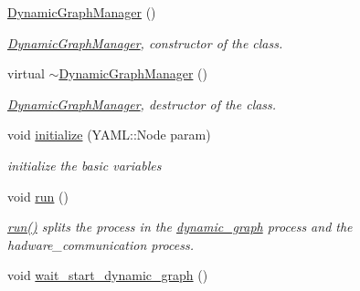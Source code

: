 \begin{DoxyCompactItemize}
\item 
\hyperlink{classdynamic__graph_1_1DynamicGraphManager_afd98424082e5a1f878e6c7cb08a62c4a}{Dynamic\+Graph\+Manager} ()\hypertarget{classdynamic__graph_1_1DynamicGraphManager_afd98424082e5a1f878e6c7cb08a62c4a}{}\label{classdynamic__graph_1_1DynamicGraphManager_afd98424082e5a1f878e6c7cb08a62c4a}

\begin{DoxyCompactList}\small\item\em \hyperlink{classdynamic__graph_1_1DynamicGraphManager}{Dynamic\+Graph\+Manager}, constructor of the class. \end{DoxyCompactList}\item 
virtual \hyperlink{classdynamic__graph_1_1DynamicGraphManager_a6bcf93d16574035ee654289274d0a790}{$\sim$\+Dynamic\+Graph\+Manager} ()\hypertarget{classdynamic__graph_1_1DynamicGraphManager_a6bcf93d16574035ee654289274d0a790}{}\label{classdynamic__graph_1_1DynamicGraphManager_a6bcf93d16574035ee654289274d0a790}

\begin{DoxyCompactList}\small\item\em \hyperlink{classdynamic__graph_1_1DynamicGraphManager}{Dynamic\+Graph\+Manager}, destructor of the class. \end{DoxyCompactList}\item 
void \hyperlink{classdynamic__graph_1_1DynamicGraphManager_ac6859456bbdd4307cb880dc5e54131dd}{initialize} (Y\+A\+M\+L\+::\+Node param)\hypertarget{classdynamic__graph_1_1DynamicGraphManager_ac6859456bbdd4307cb880dc5e54131dd}{}\label{classdynamic__graph_1_1DynamicGraphManager_ac6859456bbdd4307cb880dc5e54131dd}

\begin{DoxyCompactList}\small\item\em initialize the basic variables \end{DoxyCompactList}\item 
void \hyperlink{classdynamic__graph_1_1DynamicGraphManager_a93272fcbb3793dfc92422186022ecf72}{run} ()
\begin{DoxyCompactList}\small\item\em \hyperlink{classdynamic__graph_1_1DynamicGraphManager_a93272fcbb3793dfc92422186022ecf72}{run()} splits the process in the \hyperlink{namespacedynamic__graph}{dynamic\+\_\+graph} process and the hadware\+\_\+communication process. \end{DoxyCompactList}\item 
void \hyperlink{classdynamic__graph_1_1DynamicGraphManager_a18dab9ca9c8901779a944386f2b8898c}{wait\+\_\+start\+\_\+dynamic\+\_\+graph} ()\hypertarget{classdynamic__graph_1_1DynamicGraphManager_a18dab9ca9c8901779a944386f2b8898c}{}\label{classdynamic__graph_1_1DynamicGraphManager_a18dab9ca9c8901779a944386f2b8898c}


\end{DoxyCompactItemize}
